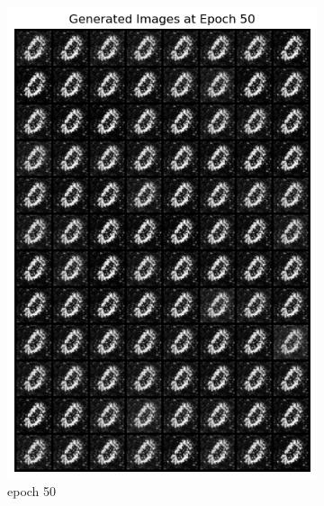 \documentclass[a4paper]{article}
\theoremstyle{definition}
\newenvironment{soln}{
	\leavevmode\color{blue}\ignorespaces
}{}
\begin{document}
\begin{enumerate} [label=(\alph*)]
\begin{soln}
\begin{figure}[H]
\begin{subfigure}[b]{0.3\textwidth}
					\includegraphics[width=\textwidth]{2-Epoch50.png}
					\caption{epoch 50}
				\end{subfigure}
				\hfill
				\begin{subfigure}[b]{0.3\textwidth}
					\centering

\end{subfigure}
\end{figure}
\end{soln}
\end{enumerate}
\end{document}
